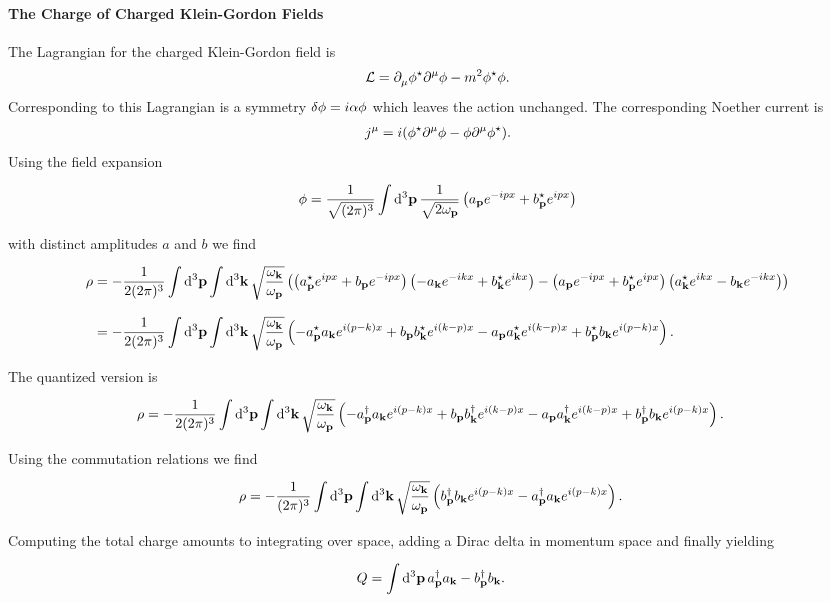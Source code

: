 \paragraph{The Charge of Charged Klein-Gordon Fields}
The Lagrangian for the charged Klein-Gordon field is
\begin{align*}
	\mathcal{L} = \partial^{}_{\mu}\phi^{\star}\partial^{\mu}_{}\phi - m^{2}\phi^{\star}\phi.
\end{align*}
Corresponding to this Lagrangian is a symmetry $\var{\phi} = i\alpha\phi$ which leaves the action unchanged. The corresponding Noether current is
\begin{align*}
	j^{\mu} = i(\phi^{\star}\partial^{\mu}_{}\phi - \phi\partial^{\mu}_{}\phi^{\star}).
\end{align*}
Using the field expansion
\begin{align*}
	\phi = \frac{1}{\sqrt{(2\pi)^{3}}}\int\limits_{}^{}\dd[3]{\vb{p}}\frac{1}{\sqrt{2\omega_{\vb{p}}}}\left(a_{\vb{p}}e^{-ipx} + b_{\vb{p}}^{\star} e^{ipx}\right)
\end{align*}
with distinct amplitudes $a$ and $b$ we find
\begin{align*}
	\rho &= -\frac{1}{2(2\pi)^{3}}\int\limits_{}^{}\dd[3]{\vb{p}}\int\limits_{}^{}\dd[3]{\vb{k}}\sqrt{\frac{\omega_{\vb{k}}}{\omega_{\vb{p}}}}\left(\left(a_{\vb{p}}^{\star} e^{ipx} + b_{\vb{p}} e^{-ipx}\right)\left(-a_{\vb{k}}e^{-ikx} + b_{\vb{k}}^{\star} e^{ikx}\right) - \left(a_{\vb{p}}e^{-ipx} + b_{\vb{p}}^{\star} e^{ipx}\right)\left(a_{\vb{k}}^{\star} e^{ikx} - b_{\vb{k}}e^{-ikx}\right)\right) \\
	     &= -\frac{1}{2(2\pi)^{3}}\int\limits_{}^{}\dd[3]{\vb{p}}\int\limits_{}^{}\dd[3]{\vb{k}}\sqrt{\frac{\omega_{\vb{k}}}{\omega_{\vb{p}}}}\left(-a_{\vb{p}}^{\star} a_{\vb{k}}e^{i(p - k)x} + b_{\vb{p}}b_{\vb{k}}^{\star} e^{i(k - p)x} - a_{\vb{p}}a_{\vb{k}}^{\star} e^{i(k - p)x} + b_{\vb{p}}^{\star} b_{\vb{k}}e^{i(p - k)x}\right). 
\end{align*}
The quantized version is
\begin{align*}
	\rho &= -\frac{1}{2(2\pi)^{3}}\int\limits_{}^{}\dd[3]{\vb{p}}\int\limits_{}^{}\dd[3]{\vb{k}}\sqrt{\frac{\omega_{\vb{k}}}{\omega_{\vb{p}}}}\left(-a_{\vb{p}}^{\dagger} a_{\vb{k}}e^{i(p - k)x} + b_{\vb{p}}b_{\vb{k}}^{\dagger} e^{i(k - p)x} - a_{\vb{p}}a_{\vb{k}}^{\dagger} e^{i(k - p)x} + b_{\vb{p}}^{\dagger} b_{\vb{k}}e^{i(p - k)x}\right).
\end{align*}
Using the commutation relations we find
\begin{align*}
	\rho &= -\frac{1}{(2\pi)^{3}}\int\limits_{}^{}\dd[3]{\vb{p}}\int\limits_{}^{}\dd[3]{\vb{k}}\sqrt{\frac{\omega_{\vb{k}}}{\omega_{\vb{p}}}}\left(b_{\vb{p}}^{\dagger} b_{\vb{k}}e^{i(p - k)x} - a_{\vb{p}}^{\dagger} a_{\vb{k}}e^{i(p - k)x}\right).
\end{align*}
Computing the total charge amounts to integrating over space, adding a Dirac delta in momentum space and finally yielding
\begin{align*}
	Q &= \int\limits_{}^{}\dd[3]{\vb{p}}a_{\vb{p}}^{\dagger} a_{\vb{k}} - b_{\vb{p}}^{\dagger} b_{\vb{k}}.
\end{align*}

